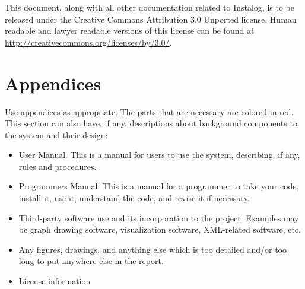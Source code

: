 \documentclass[letterpaper,12pt]{article}
\begin{document}
This document, along with all other documentation related to Instalog,  is to be
released under the Creative Commons Attribution 3.0 Unported license. Human
readable and lawyer readable versions of this license can be found at
\url{http://creativecommons.org/licenses/by/3.0/}.

\newpage



\section{Appendices} \label{appendices}
Use appendices as appropriate. The parts that are necessary are colored in red.
This section can also have, if any, descriptions about background components to
the system and their design:

\begin{itemize}
  \item User Manual.  This is a manual for users to use the system, describing,
  if any, rules and procedures.
  \item Programmers Manual.  This is a manual for a programmer to take your
  code, install it, use it, understand the code, and revise it if necessary. 
  \item Third-party software use and its incorporation to the project.  Examples
  may be graph drawing software, visualization software, XML-related software,
  etc.
  \item Any figures, drawings, and anything else which is too detailed and/or
  too long to put anywhere else in the report. 
  \item License information
\end{itemize}

\newpage



{} 


\newpage
\end{document}
